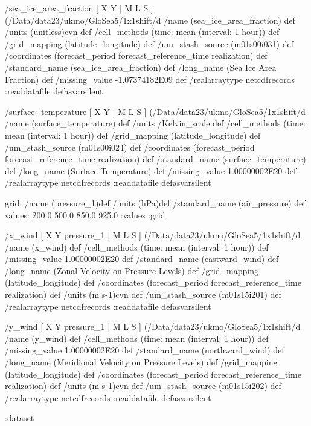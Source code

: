 \begin{ingrid}
 /sea_ice_area_fraction {
[ X Y | M L S ] (/Data/data23/ukmo/GloSea5/1x1shift/d%
/name (sea_ice_area_fraction) def
 /units (unitless)cvn def
 /cell_methods (time: mean (interval: 1 hour)) def
 /grid_mapping (latitude_longitude) def
 /um_stash_source (m01s00i031) def
 /coordinates (forecast_period forecast_reference_time realization) def
 /standard_name (sea_ice_area_fraction) def
 /long_name (Sea Ice Area Fraction) def
 /missing_value -1.07374182E09 def 
 /realarraytype netcdfrecords :readdatafile
}defasvarsilent

 /surface_temperature{
[ X Y | M L S ] (/Data/data23/ukmo/GloSea5/1x1shift/d%
/name (surface_temperature) def
 /units /Kelvin_scale def
 /cell_methods (time: mean (interval: 1 hour)) def
 /grid_mapping (latitude_longitude) def
 /um_stash_source (m01s00i024) def
 /coordinates (forecast_period forecast_reference_time realization) def
 /standard_name (surface_temperature) def
 /long_name (Surface Temperature) def
 /missing_value 1.00000002E20 def
 /realarraytype netcdfrecords :readdatafile
}defasvarsilent

grid:
/name (pressure_1)def
/units (hPa)def
/standard_name (air_pressure) def
values:  200.0 500.0 850.0 925.0  :values
:grid

 /x_wind{
[ X Y pressure_1 | M L S ] (/Data/data23/ukmo/GloSea5/1x1shift/d%
/name (x_wind) def
 /cell_methods (time: mean (interval: 1 hour)) def
 /missing_value 1.00000002E20 def
 /standard_name (eastward_wind) def
 /long_name (Zonal Velocity on Pressure Levels) def
 /grid_mapping (latitude_longitude) def
 /coordinates (forecast_period forecast_reference_time realization) def
 /units (m s-1)cvn def
 /um_stash_source (m01s15i201) def
 /realarraytype netcdfrecords :readdatafile
}defasvarsilent

 /y_wind{
[ X Y pressure_1 | M L S ] (/Data/data23/ukmo/GloSea5/1x1shift/d%
/name (y_wind) def
 /cell_methods (time: mean (interval: 1 hour)) def
 /missing_value 1.00000002E20 def
 /standard_name (northward_wind) def
 /long_name (Meridional Velocity on Pressure Levels) def
 /grid_mapping (latitude_longitude) def
 /coordinates (forecast_period forecast_reference_time realization) def
 /units (m s-1)cvn def
 /um_stash_source (m01s15i202) def
 /realarraytype netcdfrecords :readdatafile
}defasvarsilent


:dataset
\end{ingrid}
